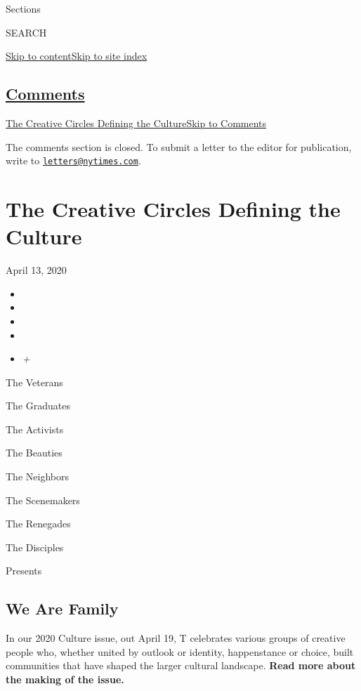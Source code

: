 Sections

SEARCH

\protect\hyperlink{site-content}{Skip to
content}\protect\hyperlink{site-index}{Skip to site index}

\hypertarget{comments}{%
\subsection{\texorpdfstring{\protect\hyperlink{commentsContainer}{Comments}}{Comments}}\label{comments}}

\href{}{The Creative Circles Defining the Culture}\href{}{Skip to
Comments}

The comments section is closed. To submit a letter to the editor for
publication, write to
\href{mailto:letters@nytimes.com}{\nolinkurl{letters@nytimes.com}}.

\hypertarget{the-creative-circles-defining-the-culture}{%
\section{The Creative Circles Defining the
Culture}\label{the-creative-circles-defining-the-culture}}

April 13, 2020

\begin{itemize}
\item
\item
\item
\item
\item
  \emph{+}
\end{itemize}

The Veterans

The Graduates

The Activists

The Beauties

The Neighbors

The Scenemakers

The Renegades

The Disciples

Presents

\hypertarget{we-are-family}{%
\subsection{We Are Family}\label{we-are-family}}

In our 2020 Culture issue, out April 19, T celebrates various groups of
creative people who, whether united by outlook or identity, happenstance
or choice, built communities that have shaped the larger cultural
landscape. \textbf{Read more about the making of the issue.}

